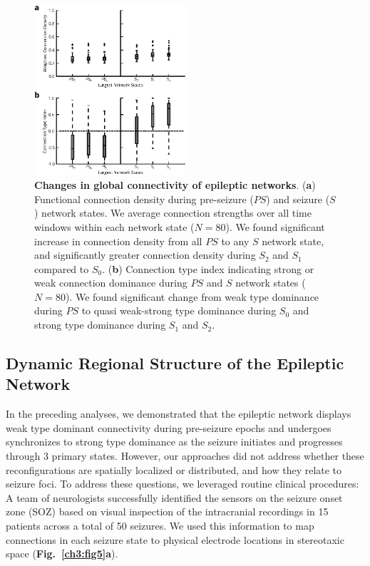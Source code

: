 \begin{figure}[H]
    \centering
    \includegraphics[width=0.5\textwidth]{panel4.eps}
    \caption[Global changes of connectivity in epileptic network states]{\textbf{Changes in global connectivity of epileptic networks}. (\textbf{a}) Functional connection density during pre-seizure ($PS$) and seizure ($S$) network states. We average connection strengths over all time windows within each network state ($N=80$). We found significant increase in connection density from all $PS$ to any $S$ network state, and significantly greater connection density during $S_2$ and $S_1$ compared to $S_0$. (\textbf{b}) Connection type index indicating strong or weak connection dominance during $PS$ and $S$ network states ($N=80$). We found significant change from weak type dominance during $PS$ to quasi weak-strong type dominance during $S_0$ and strong type dominance during $S_1$ and $S_2$.\label{ch3:fig4}}
\end{figure}

\subsection{Dynamic Regional Structure of the Epileptic Network}
In the preceding analyses, we demonstrated that the epileptic network displays weak type dominant connectivity during pre-seizure epochs and undergoes synchronizes to strong type dominance as the seizure initiates and progresses through 3 primary states. However, our approaches did not address whether these reconfigurations are spatially localized or distributed, and how they relate to seizure foci. To address these questions, we leveraged routine clinical procedures: A team of neurologists successfully identified the sensors on the seizure onset zone (SOZ) based on visual inspection of the intracranial recordings in 15 patients across a total of 50 seizures. We used this information to map connections in each seizure state to physical electrode locations in stereotaxic space (\textbf{Fig.~\ref{ch3:fig5}a}). 

